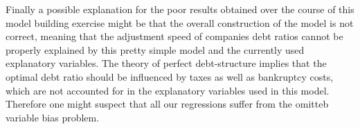 \documentclass[document.tex]{subfiles}
\begin{document}
Finally a possible explanation for the poor results obtained over the course of this model building exercise  might be that the overall construction of the model is not correct, 
meaning that the adjustment speed of companies debt ratios cannot be properly explained by this pretty simple model and the currently used explanatory variables.  The theory of perfect debt-structure implies that the optimal debt ratio should be influenced by taxes as well as bankruptcy costs, which are not accounted for in the explanatory variables used in this model. Therefore one might suspect that all our regressions suffer from the omitteb variable bias problem.
\end{document}
